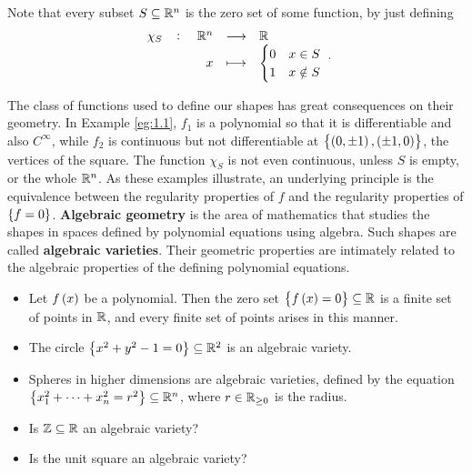 \begin{remark}
Note that every subset $ S \subseteq \mathbb{R}^n $ is the zero set of some function, by just defining
$$ \function[\chi_S]{\R^n}{\R}{x}{
\begin{cases}
0 & x \in S \\
1 & x \notin S
\end{cases}
}. $$
\end{remark}

The class of functions used to define our shapes has great consequences on their geometry. In Example \ref{eg:1.1}, $ f_1 $ is a polynomial so that it is differentiable and also $ C^\infty $, while $ f_2 $ is continuous but not differentiable at $ \cbr{\br{0, \pm 1}, \br{\pm 1, 0}} $, the vertices of the square. The function $ \chi_S $ is not even continuous, unless $ S $ is empty, or the whole $ \mathbb{R}^n $. As these examples illustrate, an underlying principle is the equivalence between the regularity properties of $ f $ and the regularity properties of $ \cbr{f = 0} $. \textbf{Algebraic geometry} is the area of mathematics that studies the shapes in spaces defined by polynomial equations using algebra. Such shapes are called \textbf{algebraic varieties}. Their geometric properties are intimately related to the algebraic properties of the defining polynomial equations.

\begin{example}
\hfill
\begin{itemize}
\item Let $ f\br{x} $ be a polynomial. Then the zero set $ \cbr{f\br{x} = 0} \subseteq \R $ is a finite set of points in $ \mathbb{R} $, and every finite set of points arises in this manner.
\item The circle $ \cbr{x^2 + y^2 - 1 = 0} \subseteq \R^2 $ is an algebraic variety.
\item Spheres in higher dimensions are algebraic varieties, defined by the equation $ \cbr{x_1^2 + \dots + x_n^2 = r^2} \subseteq \R^n $, where $ r \in \mathbb{R}_{\ge 0} $ is the radius.
\end{itemize}
\end{example}

\begin{exercise}
\hfill
\begin{itemize}
\item Is $ \mathbb{Z} \subseteq \mathbb{R} $ an algebraic variety?
\item Is the unit square an algebraic variety?
\end{itemize}
\end{exercise}

